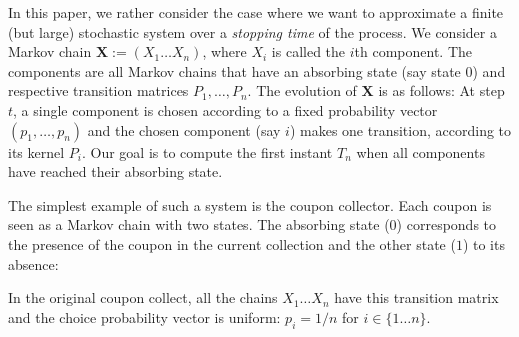 \documentclass{aptpub}
\newcommand\bX{\mathbf{X}}
\begin{document}
In this paper, we rather consider the case where we want to
approximate a finite (but large) stochastic system over a {\it
  stopping time} of the process.
We consider a Markov chain $\bX:=(X_1\dots X_n)$, where $X_i$ is
called the $i$th component. The components are all Markov chains that
have an absorbing state (say state $0$) and respective transition
matrices $P_1, \ldots, P_n$.  The evolution of $\bX$ is as follows: At step
$t$, a single component is chosen according to a fixed probability
vector $(p_1,\ldots, p_n)$ and the chosen component (say $i$) makes
one transition, according to its kernel $P_i$.  Our goal is to compute
the first instant $T_n$ when all components have reached their
absorbing state.



The simplest example of such a system is the coupon collector. Each
coupon is seen as a Markov chain with two states. The absorbing state
($0$) corresponds to the presence of the coupon in the current
collection and the other state ($1$) to its absence:
\begin{center}
\end{center}
In the original coupon collect, all the chains $X_1\ldots X_n$ have
this transition matrix and the choice probability vector is uniform:
$p_i=1/n$ for $i\in\{1\dots n\}$.
\end{document}
